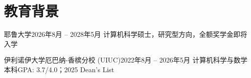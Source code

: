 \section{教育背景}
  \resumeSubHeadingListStart
    \resumeSubheadingCourse
    {耶鲁大学}{2026年8月 -- 2028年5月}
    {计算机科学硕士，研究型方向，全额奖学金}{即将入学}

    \resumeSubheadingCourse
      {伊利诺伊大学厄巴纳-香槟分校 (UIUC)}{2022年8月 -- 2026年5月}
      {计算机科学与数学本科}{GPA: 3.7/4.0；2025 Dean's List}
    \vspace{0.6pt}

  \resumeSubHeadingListEnd
